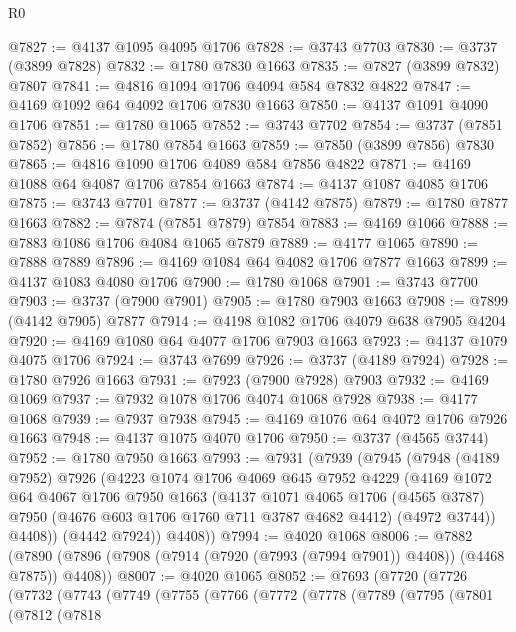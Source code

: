 \begin{lexlean}{R0}
\begin{coremodule}
@7827 := @4137 @1095 @4095 @1706
@7828 := @3743 @7703
@7830 := @3737 (@3899 @7828)
@7832 := @1780 @7830 @1663
@7835 := @7827 (@3899 @7832) @7807
@7841 := @4816 @1094 @1706 @4094 @584 @7832 @4822
@7847 := @4169 @1092 @64 @4092 @1706 @7830 @1663
@7850 := @4137 @1091 @4090 @1706
@7851 := @1780 @1065
@7852 := @3743 @7702
@7854 := @3737 (@7851 @7852)
@7856 := @1780 @7854 @1663
@7859 := @7850 (@3899 @7856) @7830
@7865 := @4816 @1090 @1706 @4089 @584 @7856 @4822
@7871 := @4169 @1088 @64 @4087 @1706 @7854 @1663
@7874 := @4137 @1087 @4085 @1706
@7875 := @3743 @7701
@7877 := @3737 (@4142 @7875)
@7879 := @1780 @7877 @1663
@7882 := @7874 (@7851 @7879) @7854
@7883 := @4169 @1066
@7888 := @7883 @1086 @1706 @4084 @1065 @7879
@7889 := @4177 @1065
@7890 := @7888 @7889
@7896 := @4169 @1084 @64 @4082 @1706 @7877 @1663
@7899 := @4137 @1083 @4080 @1706
@7900 := @1780 @1068
@7901 := @3743 @7700
@7903 := @3737 (@7900 @7901)
@7905 := @1780 @7903 @1663
@7908 := @7899 (@4142 @7905) @7877
@7914 := @4198 @1082 @1706 @4079 @638 @7905 @4204
@7920 := @4169 @1080 @64 @4077 @1706 @7903 @1663
@7923 := @4137 @1079 @4075 @1706
@7924 := @3743 @7699
@7926 := @3737 (@4189 @7924)
@7928 := @1780 @7926 @1663
@7931 := @7923 (@7900 @7928) @7903
@7932 := @4169 @1069
@7937 := @7932 @1078 @1706 @4074 @1068 @7928
@7938 := @4177 @1068
@7939 := @7937 @7938
@7945 := @4169 @1076 @64 @4072 @1706 @7926 @1663
@7948 := @4137 @1075 @4070 @1706
@7950 := @3737 (@4565 @3744)
@7952 := @1780 @7950 @1663
@7993 := @7931
    (@7939
      (@7945
        (@7948
          (@4189 @7952)
          @7926
          (@4223
            @1074
            @1706
            @4069
            @645
            @7952
            @4229
            (@4169
              @1072
              @64
              @4067
              @1706
              @7950
              @1663
              (@4137
                @1071
                @4065
                @1706
                (@4565 @3787)
                @7950
                (@4676 @603 @1706 @1760 @711 @3787 @4682 @4412)
                (@4972 @3744))
              @4408))
          (@4442 @7924))
        @4408))
@7994 := @4020 @1068
@8006 := @7882
    (@7890 (@7896 (@7908 (@7914 (@7920 (@7993 (@7994 @7901)) @4408)) (@4468 @7875)) @4408))
@8007 := @4020 @1065
@8052 := @7693
    (@7720
      (@7726
        (@7732
          (@7743
            (@7749
              (@7755
                (@7766
                  (@7772
                    (@7778
                      (@7789
                        (@7795
                          (@7801
                            (@7812
                              (@7818

\end{coremodule}
\end{lexlean}
